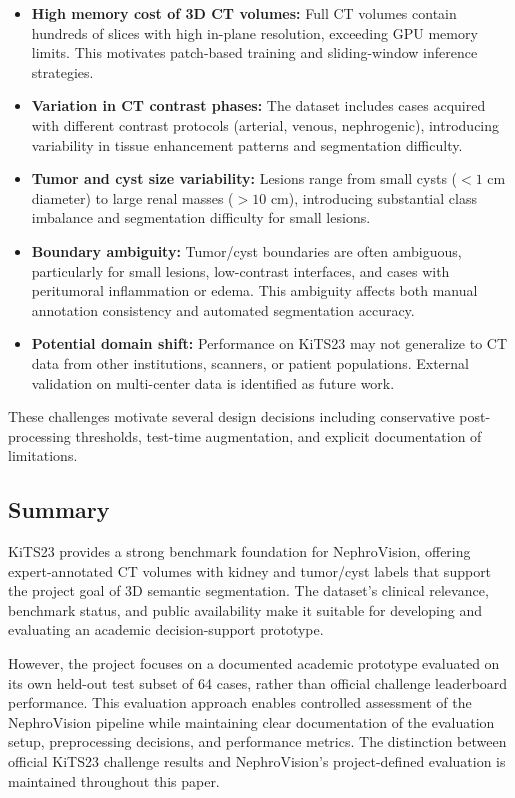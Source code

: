 \begin{itemize}
    \item \textbf{High memory cost of 3D CT volumes:} Full CT volumes contain hundreds of slices with high in-plane resolution, exceeding GPU memory limits. This motivates patch-based training and sliding-window inference strategies.
    \item \textbf{Variation in CT contrast phases:} The dataset includes cases acquired with different contrast protocols (arterial, venous, nephrogenic), introducing variability in tissue enhancement patterns and segmentation difficulty.
    \item \textbf{Tumor and cyst size variability:} Lesions range from small cysts ($< 1$ cm diameter) to large renal masses ($> 10$ cm), introducing substantial class imbalance and segmentation difficulty for small lesions.
    \item \textbf{Boundary ambiguity:} Tumor/cyst boundaries are often ambiguous, particularly for small lesions, low-contrast interfaces, and cases with peritumoral inflammation or edema. This ambiguity affects both manual annotation consistency and automated segmentation accuracy.
    \item \textbf{Potential domain shift:} Performance on KiTS23 may not generalize to CT data from other institutions, scanners, or patient populations. External validation on multi-center data is identified as future work.
\end{itemize}

These challenges motivate several design decisions including conservative post-processing thresholds, test-time augmentation, and explicit documentation of limitations.

\subsection{Summary}

KiTS23 provides a strong benchmark foundation for NephroVision, offering expert-annotated CT volumes with kidney and tumor/cyst labels that support the project goal of 3D semantic segmentation. The dataset's clinical relevance, benchmark status, and public availability make it suitable for developing and evaluating an academic decision-support prototype.

However, the project focuses on a documented academic prototype evaluated on its own held-out test subset of 64 cases, rather than official challenge leaderboard performance. This evaluation approach enables controlled assessment of the NephroVision pipeline while maintaining clear documentation of the evaluation setup, preprocessing decisions, and performance metrics. The distinction between official KiTS23 challenge results and NephroVision's project-defined evaluation is maintained throughout this paper.
